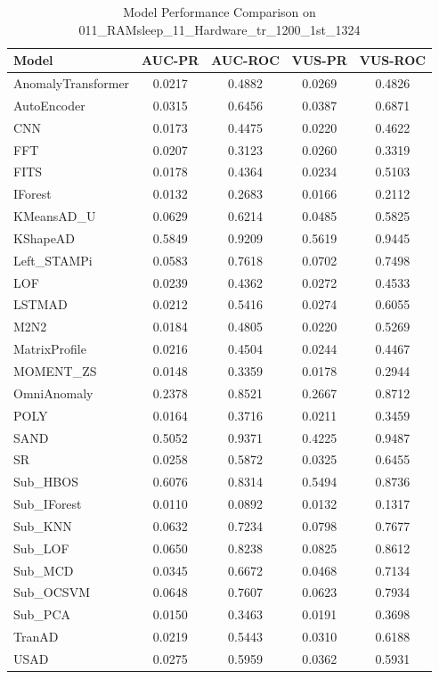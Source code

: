 \documentclass[12pt,oneside]{article}
\begin{document}
\begin{table}[H]
    \centering
    \caption{Model Performance Comparison on 011\_RAMsleep\_11\_Hardware\_tr\_1200\_1st\_1324}
    \begin{tabular}{|l|c|c|c|c|}
        \toprule
        \textbf{Model} & \textbf{AUC-PR} & \textbf{AUC-ROC} & \textbf{VUS-PR} & \textbf{VUS-ROC} \\
        \midrule
        AnomalyTransformer & 0.0217 & 0.4882 & 0.0269 & 0.4826 \\
        AutoEncoder & 0.0315 & 0.6456 & 0.0387 & 0.6871 \\
        CNN & 0.0173 & 0.4475 & 0.0220 & 0.4622 \\
        FFT & 0.0207 & 0.3123 & 0.0260 & 0.3319 \\
        FITS & 0.0178 & 0.4364 & 0.0234 & 0.5103 \\
        IForest & 0.0132 & 0.2683 & 0.0166 & 0.2112 \\
        KMeansAD\_U & 0.0629 & 0.6214 & 0.0485 & 0.5825 \\
        KShapeAD & 0.5849 & 0.9209 & 0.5619 & 0.9445 \\
        Left\_STAMPi & 0.0583 & 0.7618 & 0.0702 & 0.7498 \\
        LOF & 0.0239 & 0.4362 & 0.0272 & 0.4533 \\
        LSTMAD & 0.0212 & 0.5416 & 0.0274 & 0.6055 \\
        M2N2 & 0.0184 & 0.4805 & 0.0220 & 0.5269 \\
        MatrixProfile & 0.0216 & 0.4504 & 0.0244 & 0.4467 \\
        MOMENT\_ZS & 0.0148 & 0.3359 & 0.0178 & 0.2944 \\
        OmniAnomaly & 0.2378 & 0.8521 & 0.2667 & 0.8712 \\
        POLY & 0.0164 & 0.3716 & 0.0211 & 0.3459 \\
        SAND & 0.5052 & 0.9371 & 0.4225 & 0.9487 \\
        SR & 0.0258 & 0.5872 & 0.0325 & 0.6455 \\
        Sub\_HBOS & 0.6076 & 0.8314 & 0.5494 & 0.8736 \\
        Sub\_IForest & 0.0110 & 0.0892 & 0.0132 & 0.1317 \\
        Sub\_KNN & 0.0632 & 0.7234 & 0.0798 & 0.7677 \\
        Sub\_LOF & 0.0650 & 0.8238 & 0.0825 & 0.8612 \\
        Sub\_MCD & 0.0345 & 0.6672 & 0.0468 & 0.7134 \\
        Sub\_OCSVM & 0.0648 & 0.7607 & 0.0623 & 0.7934 \\
        Sub\_PCA & 0.0150 & 0.3463 & 0.0191 & 0.3698 \\
        TranAD & 0.0219 & 0.5443 & 0.0310 & 0.6188 \\
        USAD & 0.0275 & 0.5959 & 0.0362 & 0.5931 \\
        \bottomrule
    \end{tabular}

    \label{tab:model_performance_RAMsleep}
\end{table}
\end{document}
